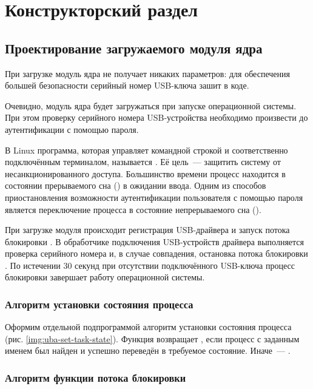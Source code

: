 \chapter{Конструкторский раздел}

\section{Проектирование загружаемого модуля ядра}

При загрузке модуль ядра не получает никаких параметров: для обеспечения большей безопасности серийный номер USB-ключа зашит в коде.

Очевидно, модуль ядра будет загружаться при запуске операционной системы.
При этом проверку серийного номера USB-устройства необходимо произвести до аутентификации с помощью пароля.

В Linux программа, которая управляет командной строкой и соответственно подключённым терминалом, называется .
Её цель~— защитить систему от несанкционированного доступа.
Большинство времени процесс  находится в состоянии прерываемого сна () в ожидании ввода.
Одним из способов приостановления возможности аутентификации пользователя с помощью пароля является переключение процесса  в состояние непрерываемого сна ().

При загрузке модуля происходит регистрация USB-драйвера и запуск потока блокировки .
В обработчике подключения USB-устройств драйвера выполняется проверка серийного номера и, в случае совпадения, остановка потока блокировки .
По истечении 30 секунд при отсутствии подключённого USB-ключа процесс блокировки  завершает работу операционной системы.

\subsection{Алгоритм установки состояния процесса}

Оформим отдельной подпрограммой алгоритм установки состояния процесса (рис. \ref{img:uba-set-task-state}).
Функция возвращает , если процесс с заданным именем был найден и успешно переведён в требуемое состояние.
Иначе~— .


\subsection{Алгоритм функции потока блокировки}

